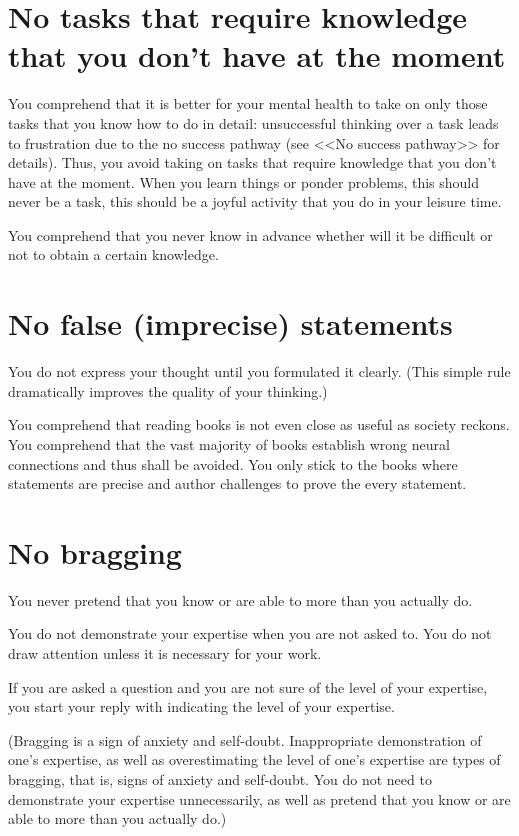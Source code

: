 \documentclass[11pt]{article}
\theoremstyle{remark}
\theoremstyle{definition}
\begin{document}
\section{No tasks that require knowledge that you don't have at the moment} 


You comprehend that it is better for your mental health to take on only those tasks that you know how to do in detail: unsuccessful thinking over a task leads to frustration due to the no success pathway (see <<No success pathway>> for details). Thus, you avoid taking on tasks that require knowledge that you don't have at the moment. When you learn things or ponder problems, this should never be a task, this should be a joyful activity that you do in your leisure time.

You comprehend that you never know in advance whether will it be difficult or not to obtain a certain knowledge.








\section{No false (imprecise) statements}




You do not express your thought until you formulated it clearly. (This simple rule dramatically improves the quality of your thinking.)


You comprehend that reading books is not even close as useful as society reckons. You comprehend that the vast majority of books establish wrong neural connections and thus shall be avoided. You only stick to the books where statements are precise and author challenges to prove the every statement.


\section{No bragging}

You never pretend that you know or are able to more than you actually do.

You do not demonstrate your expertise when you are not asked to. You do not draw attention unless it is necessary for your work.

If you are asked a question and you are not sure of the level of your expertise, you start your reply with indicating the level of your expertise.

(Bragging is a sign of anxiety and self-doubt. Inappropriate demonstration of one's expertise, as well as overestimating the level of one's expertise are types of bragging, that is, signs of anxiety and self-doubt. You do not need to demonstrate your expertise unnecessarily, as well as pretend that you know or are able to more than you actually do.)
\end{document}
